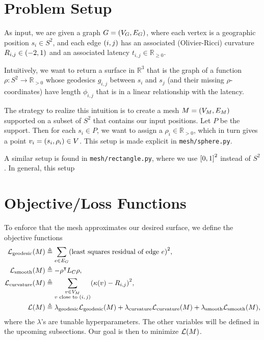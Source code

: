 \documentclass[10pt]{article}
\newcommand*\delimeter[3]{
	\ensuremath{\mathopen{}\left#2 #1\right#3\mathclose{}{\vphantom{\left#2 #1\right#3}}}
}
\newcommand*\pof[1]{\delimeter{#1}{(}{)}}
\newcommand*\ooint[1]{\delimeter{#1}{(}{)}}
\newcommand*\ccint[1]{\delimeter{#1}{[}{]}}
\begin{document}

	\section{Problem Setup}

	As input, we are given a graph \(G = \pof{V_G, E_G}\), where each vertex is a geographic position \(s_i \in S^2\), and each edge \(\pof{i, j}\) has an associated (Olivier-Ricci) curvature \(R_{i, j} \in \ooint{-2, 1}\) and an associated latency \(t_{i, j} \in \mathbb{R}_{\ge 0}\).

	Intuitively, we want to return a surface in \(\mathbb{R}^3\) that is the graph of a function \(\rho : S^2 \to \mathbb{R}_{> 0}\) whose geodesics \(g_{i, j}\) between \(s_i\) and \(s_j\) (and their missing \(\rho\)-coordinates) have length \(\phi_{i, j}\) that is in a linear relationship with the latency.

	The strategy to realize this intuition is to create a mesh \(M = \pof{V_M, E_M}\) supported on a subset of \(S^2\) that contains our input positions. Let \(P\) be the support. Then for each \(s_i \in P\), we want to assign a \(\rho_i \in \mathbb{R}_{> 0}\), which in turn gives a point \(v_i = \pof{s_i, \rho_i} \in V\). This setup is made explicit in \texttt{mesh/sphere.py}.

	A similar setup is found in \texttt{mesh/rectangle.py}, where we use \(\ccint{0, 1}^2\) instead of \(S^2\). In general, this setup 

	\section{Objective/Loss Functions}

	To enforce that the mesh approximates our desired surface, we define the objective functions \begin{align*}
		\mathcal{L}_{\mathrm{geodesic}}\pof{M} &\triangleq \sum_{e \in E_G} \pof{\text{least squares residual of edge \(e\)}}^2, \\
		\mathcal{L}_{\mathrm{smooth}}\pof{M} &\triangleq -\rho^\intercal L_C\rho, \\
		\mathcal{L}_{\mathrm{curvature}}\pof{M} &\triangleq \sum_{\substack{v \in V_M \\ \text{\(v\) close to \(\pof{i, j}\)}}} \pof{\kappa\pof{v} - R_{i, j}}^2, \\
		\mathcal{L}\pof{M} &\triangleq \lambda_{\mathrm{geodesic}}\mathcal{L}_{\mathrm{geodesic}}\pof{M} + \lambda_{\mathrm{curvature}}\mathcal{L}_{\mathrm{curvature}}\pof{M} + \lambda_{\mathrm{smooth}}\mathcal{L}_{\mathrm{smooth}}\pof{M},
	\end{align*} where the \(\lambda\)'s are tunable hyperparameters. The other variables will be defined in the upcoming subsections. Our goal is then to minimize \(\mathcal{L}\pof{M}\).
\end{document}
